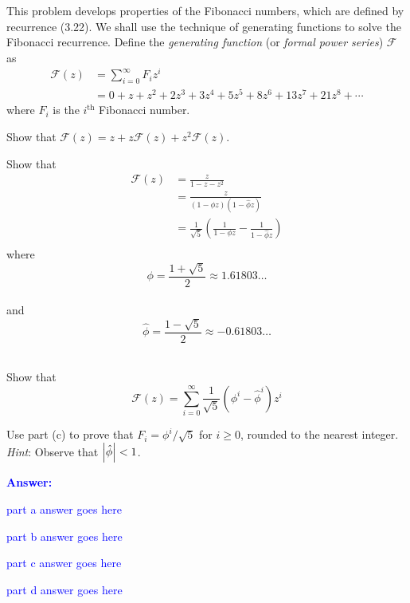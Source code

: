 \item{}
This problem develops properties of the Fibonacci numbers, which are defined by
recurrence (3.22). We shall use the technique of generating functions to solve
the Fibonacci recurrence. Define the \emph{generating function} (or \emph{formal
power series}) $\mathscr{F}$ as
\begin{align*}
\mathscr{F}(z)&=\sum_{i=0}^\infty F_iz^i\\
&=0+z+z^2+2z^3+3z^4+5z^5+8z^6+13z^7+21z^8+\cdots
\end{align*}
where $F_i$ is the $i^{\text{th}}$ Fibonacci number.
\begin{list}{\textbf{}}{}
\item Show that $\mathscr{F}(z)=z+z\mathscr{F}(z)+z^2\mathscr{F}(z)$.
\item Show that
\begin{align*}
\mathscr{F}(z)&=\frac{z}{1-z-z^2}\\
&=\frac{z}{\left(1-\phi z\right)\left(1-\hat\phi z\right)}\\
&=\frac{1}{\sqrt{5}}\left(\frac{1}{1-\phi z}-\frac{1}{1-\hat\phi z}\right)\\
\end{align*}
where $$\phi=\frac{1+\sqrt{5}}{2}\approx1.61803\ldots$$\\
and $$\hat\phi=\frac{1-\sqrt{5}}{2}\approx-0.61803\ldots$$\\
\item Show that $$\mathscr{F}(z)=\sum_{i=0}^\infty\frac{1}{\sqrt{5}}\left(
\phi^i-\hat\phi^i\right)z^i$$
\item Use part (c) to prove that $F_i=\phi^i/\sqrt{5}$ for $i\ge 0$, rounded
to the nearest integer. \emph{Hint\/}: Observe that $\left^^7c\hat\phi\right^^7c
<1$.
\end{list}
\vskip12pt
\ifanswers
\textcolor{blue}{
\textbf{Answer:}\\
\begin{list}{\textbf{}}{}
\item part a answer goes here
\item part b answer goes here
\item part c answer goes here
\item part d answer goes here
\end{list}
}
\newpage
\fi
